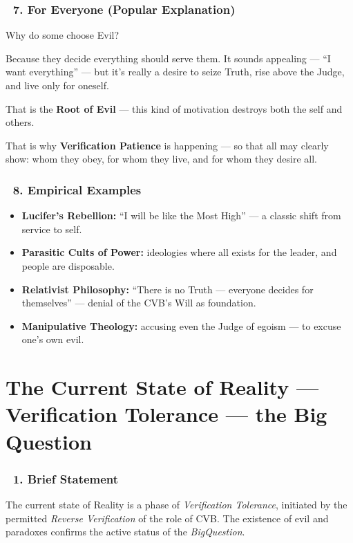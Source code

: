 \documentclass[12pt]{article}
\begin{document}
\subsubsection*{🔹 7. For Everyone (Popular Explanation)}

Why do some choose Evil?

Because they decide everything should serve them. It sounds appealing — ``I want everything'' — but it’s really a desire to seize Truth, rise above the Judge, and live only for oneself.

That is the \textbf{Root of Evil} — this kind of motivation destroys both the self and others.

That is why \textbf{Verification Patience} is happening — so that all may clearly show: whom they obey, for whom they live, and for whom they desire all.

\subsubsection*{🔹 8. Empirical Examples}

\begin{itemize}
\item \textbf{Lucifer’s Rebellion:} ``I will be like the Most High'' — a classic shift from service to self.
\item \textbf{Parasitic Cults of Power:} ideologies where all exists for the leader, and people are disposable.
\item \textbf{Relativist Philosophy:} ``There is no Truth — everyone decides for themselves'' — denial of the CVB's Will as foundation.
\item \textbf{Manipulative Theology:} accusing even the Judge of egoism — to excuse one’s own evil.
\end{itemize}


\section*{\text{[26]} The Current State of Reality — Verification Tolerance — the Big Question}

\subsubsection*{🔹 1. Brief Statement}

The current state of Reality is a phase of \textit{Verification Tolerance}, initiated by the permitted \textit{Reverse Verification} of the role of CVB. The existence of evil and paradoxes confirms the active status of the \textit{BigQuestion}.
\end{document}
